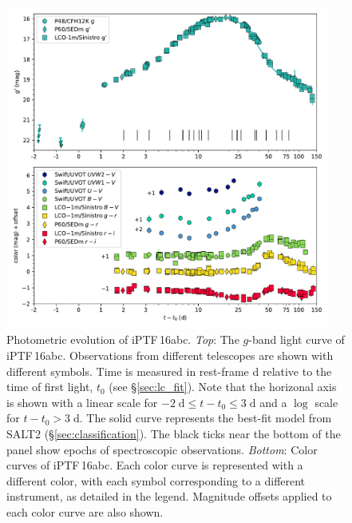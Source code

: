 \documentclass[twocolumn]{aastex61}
\newcommand{\abc}{iPTF\,16abc}
\begin{document}
\begin{figure}[htb]
  \centering
  \includegraphics[width=0.95\textwidth]{logLC_with_colors.pdf}
  \caption{Photometric evolution of \abc. \textit{Top}: The $g$-band
  light curve of \abc. Observations from different 
  telescopes are shown with different symbols. Time is measured in 
  rest-frame d relative to the time of first light, $t_0$ (see 
  \S\ref{sec:lc_fit}). Note that the horizonal axis is shown with a linear scale 
  for $-2 \; \mathrm{d} \le t - t_0 \le 3 \; \mathrm{d}$ and a 
  $\log$ scale for $t - t_0 > 3 \; \mathrm{d}$. The solid curve 
  represents the best-fit model from SALT2 
  (\S\ref{sec:classification}). The black ticks near the
  bottom of the panel show epochs of spectroscopic observations.
  \textit{Bottom}: Color curves of \abc. Each color curve is 
  represented with a different color, with each symbol corresponding 
  to a different instrument, as detailed in the legend. Magnitude 
  offsets applied to each color curve are also shown.
  }
  \label{fig:lightcurve}
\end{figure}
\end{document}
